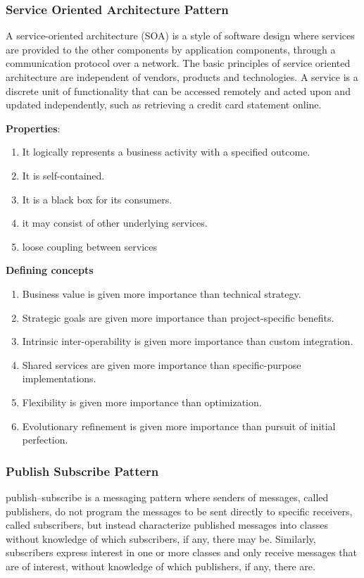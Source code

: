 \documentclass[a4paper]{article}
\begin{document}
\subsubsection{Service Oriented Architecture Pattern}
A service-oriented architecture (SOA) is a style of software design where services are provided to the other components by application components, through a communication protocol over a network. The basic principles of service oriented architecture are independent of vendors, products and technologies. A service is a discrete unit of functionality that can be accessed remotely and acted upon and updated independently, such as retrieving a credit card statement online.

\textbf{Properties}:
\begin{enumerate}
\item It logically represents a business activity with a specified outcome.
\item It is self-contained.
\item It is a black box for its consumers.
\item it may consist of other underlying services.
\item loose coupling between services
\end{enumerate}

\textbf{Defining concepts}
\begin{enumerate}
\item Business value is given more importance than technical strategy.
\item Strategic goals are given more importance than project-specific benefits.
\item Intrinsic inter-operability is given more importance than custom integration.
\item Shared services are given more importance than specific-purpose implementations.
\item Flexibility is given more importance than optimization.
\item Evolutionary refinement is given more importance than pursuit of initial perfection.
\end{enumerate}

\subsubsection{Publish Subscribe Pattern}
publish–subscribe is a messaging pattern where senders of messages, called publishers, do not program the messages to be sent directly to specific receivers, called subscribers, but instead characterize published messages into classes without knowledge of which subscribers, if any, there may be. Similarly, subscribers express interest in one or more classes and only receive messages that are of interest, without knowledge of which publishers, if any, there are.
\end{document}
